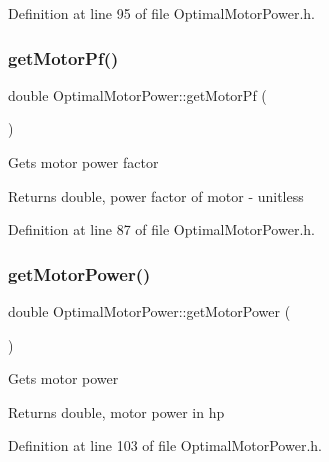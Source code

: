 Definition at line 95 of file Optimal\+Motor\+Power.\+h.

\mbox{\label{class_optimal_motor_power_a94d4c8a84c1bd19b799e35b966368f5a}} 
\subsubsection{\texorpdfstring{get\+Motor\+Pf()}{getMotorPf()}}
{\footnotesize\ttfamily double Optimal\+Motor\+Power\+::get\+Motor\+Pf (\begin{DoxyParamCaption}{ }\end{DoxyParamCaption})\hspace{0.3cm}{\ttfamily [inline]}}

Gets motor power factor \begin{DoxyReturn}{Returns}
double, power factor of motor -\/ unitless 
\end{DoxyReturn}


Definition at line 87 of file Optimal\+Motor\+Power.\+h.

\mbox{\label{class_optimal_motor_power_af35a32c24df9198bcf0df5b8f6ea03a9}} 
\subsubsection{\texorpdfstring{get\+Motor\+Power()}{getMotorPower()}}
{\footnotesize\ttfamily double Optimal\+Motor\+Power\+::get\+Motor\+Power (\begin{DoxyParamCaption}{ }\end{DoxyParamCaption})\hspace{0.3cm}{\ttfamily [inline]}}

Gets motor power \begin{DoxyReturn}{Returns}
double, motor power in hp 
\end{DoxyReturn}


Definition at line 103 of file Optimal\+Motor\+Power.\+h.

\mbox{\label{class_optimal_motor_power_a7d6e976abf406c54637d3b51e098d7c8}} 
